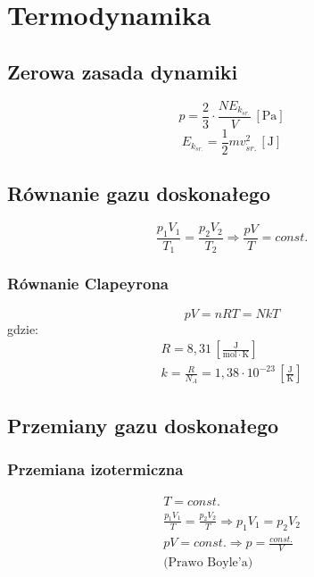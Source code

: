 \documentclass{article}
\numberwithin{equation}{section}
\newcommand{\unit}[1]{\, \left[\mathrm{#1}\right]}
\begin{document}
  \newpage
  \section{Termodynamika}
    \subsection{Zerowa zasada dynamiki}
      \begin{equation}
        p = \frac{2}{3}\cdot\frac{NE_{k_{\acute sr.}}}{V} \unit{Pa}
      \end{equation}
      \begin{equation}
        E_{k_{\acute sr.}} = \frac{1}{2}mv_{\acute sr.}^2 \unit{J}
      \end{equation}
    \subsection{Równanie gazu doskonałego}
      \begin{equation}
        \frac{p_1V_1}{T_1} = \frac{p_2V_2}{T_2} \Rightarrow \frac{pV}{T} = const.
      \end{equation}
      \subsubsection{Równanie Clapeyrona}
        \begin{equation}
          pV = nRT = NkT
        \end{equation}
        gdzie:
        \begin{gather}
          R =  8,31 \unit{\frac{J}{mol\cdot K}}\\
          k = \frac{R}{N_A} = 1,38\cdot 10^{-23} \unit{\frac{J}{K}}
        \end{gather}
    \subsection{Przemiany gazu doskonałego}
      \subsubsection{Przemiana izotermiczna}
        \begin{gather}
          T = const.\\
          \frac{p_1V_1}{T} = \frac{p_2V_2}{T} \Rightarrow p_1V_1 = p_2V_2\\
          pV = const. \Rightarrow p = \frac{const.}{V}\\
          \text{(Prawo Boyle'a)}
        \end{gather}
\end{document}
